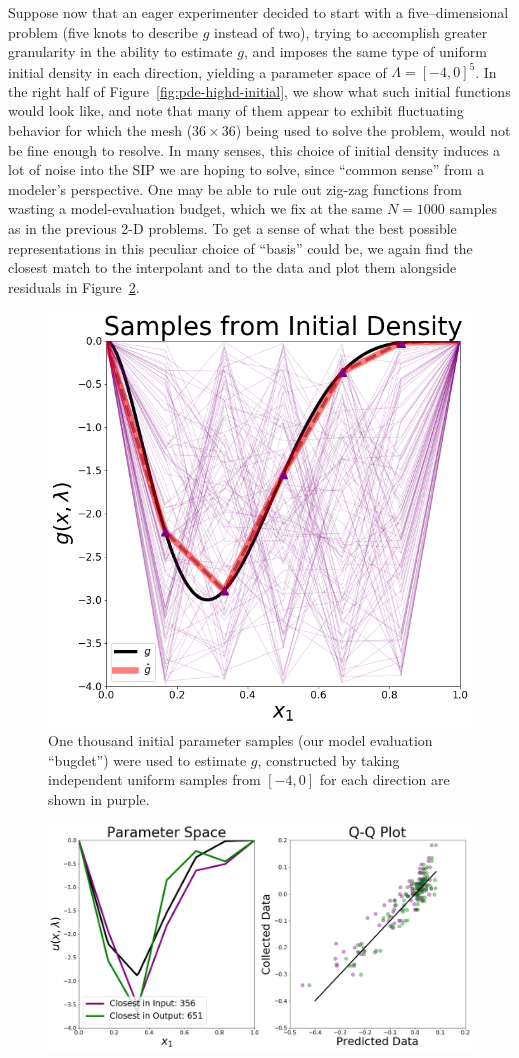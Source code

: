 Suppose now that an eager experimenter decided to start with a five--dimensional problem (five knots to describe $g$ instead of two), trying to accomplish greater granularity in the ability to estimate $g$, and imposes the same type of uniform initial density in each direction, yielding a parameter space of $\Lambda = [-4, 0]^5$.
In the right half of Figure~\ref{fig:pde-highd-initial}, we show what such initial functions would look like, and note that many of them appear to exhibit fluctuating behavior for which the mesh ($36\times36$) being used to solve the problem, would not be fine enough to resolve.
In many senses, this choice of initial density induces a lot of noise into the SIP we are hoping to solve, since ``common sense'' from a modeler's perspective.
One may be able to rule out zig-zag functions from wasting a model-evaluation budget, which we fix at the same $N=1000$ samples as in the previous 2-D problems.
To get a sense of what the best possible representations in this peculiar choice of ``basis'' could be, we again find the closest match to the interpolant and to the data and plot them alongside residuals in Figure~\ref{fig:pde-5d-proj}.

\begin{figure}
\centering
  \includegraphics[width=0.475\linewidth]{figures/pde-highd/pde-highd_init_D5.png}
\caption{
One thousand initial parameter samples (our model evaluation ``bugdet'') were used to estimate $g$, constructed by taking independent uniform samples from $[-4, 0]$ for each direction are shown in purple.
}
\label{fig:pde-highd-initial-5d}
\end{figure}


\begin{figure}[htbp]
\centering
  \includegraphics[width=0.675\linewidth]{figures/pde-highd/pde-highd_proj_D5}
\caption{
}
\label{fig:pde-5d-proj}
\end{figure}

